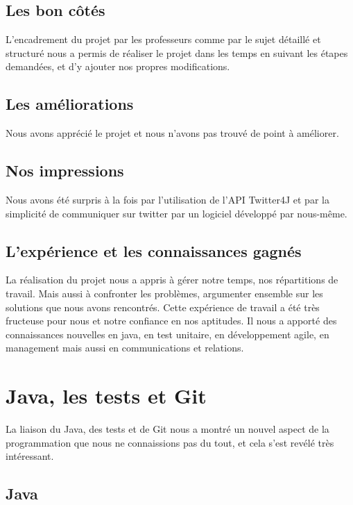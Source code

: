 \documentclass[12pt]{article}
\begin{document}
\subsection{Les bon côtés}
L'encadrement du projet par les professeurs comme par le sujet détaillé et structuré nous a permis de réaliser le projet dans les temps en suivant les étapes demandées, et d'y ajouter nos propres modifications.\\

\subsection{Les améliorations}
Nous avons apprécié le projet et nous n'avons pas trouvé de point à améliorer.\\

\subsection{Nos impressions}
Nous avons été surpris à la fois par l'utilisation de l'API Twitter4J et par la simplicité de communiquer sur twitter par un logiciel développé par nous-même.\\

\subsection{L'expérience et les connaissances gagnés}
La réalisation du projet nous a appris à gérer notre temps, nos répartitions de travail. Mais aussi à confronter les problèmes, argumenter ensemble sur les solutions que nous avons rencontrés. Cette expérience de travail a été très fructeuse pour nous et notre confiance en nos aptitudes. Il nous a apporté des connaissances nouvelles en java, en test unitaire, en développement agile, en management mais aussi en communications et relations.

\newpage
\section{Java, les tests et Git}

La liaison du Java, des tests et de Git nous a montré un nouvel aspect de la programmation que nous ne connaissions pas du tout, et cela s'est revélé très intéressant.

\subsection{Java}
\end{document}
